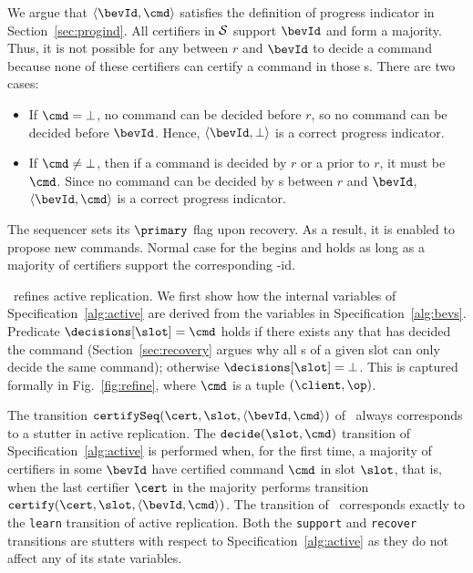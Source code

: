 We argue that $\langle \bevId, \cmd \rangle$ satisfies the definition
of progress indicator in Section~\ref{sec:progind}.  All certifiers
in $\cal S$ support $\bevId$ and form a majority.  Thus, it is not
possible for any {\round} between $r$ and $\bevId$ to decide a command
because none of these certifiers can certify a command in those
{\round}s.  There are two cases:

\begin{itemize}\item If $\cmd = \bot$, no command can be
decided before $r$, so no command can be decided before $\bevId$.
Hence, $\langle \bevId, \bot \rangle$ is a correct progress indicator.
\item If $\cmd \ne \bot$, then if a command is decided by
$r$ or a {\round} prior to $r$, it must be $\cmd$.
Since no command can be decided by {\round}s between $r$ and $\bevId$,
$\langle \bevId, \cmd \rangle$ is a correct progress indicator.
\end{itemize}



\noindent
The sequencer sets its $\primary$ flag upon recovery.  As a result, it
is enabled to propose new commands. Normal case for the {\round} begins
and holds as long as a majority of certifiers support the corresponding
{\round}-id.



\multiconsensus\ refines active replication.
We first show how the internal variables of Specification~\ref{alg:active} are
derived from the variables in Specification~\ref{alg:bevs}.
Predicate $\decisions[\slot] = \cmd$ holds if there exists any {\round} that has decided
the command (Section~\ref{sec:recovery} argues why all {\round}s of a given slot can only decide the same command); otherwise $\decisions[\slot] = \bot$.
This is captured formally in
Fig.~\ref{fig:refine}, where $\cmd$ is a tuple $(\client, \op)$.

The transition $\texttt{certifySeq}(\cert, \slot, \langle \bevId, \cmd \rangle)$
 of \multiconsensus\ always corresponds to a stutter in active replication.
The $\texttt{decide}(\slot, \cmd)$ transition
of Specification~\ref{alg:active} is performed
when, for the first time, a majority of certifiers in some
{\round} $\bevId$ have certified command $\cmd$
in slot $\slot$, that is, when
the last certifier $\cert$ in the majority performs transition
$\texttt{certify}(\cert, \slot, \langle \bevId, \cmd \rangle)$.
The \texttt{\observedecision} transition of \multiconsensus\ corresponds exactly
to the \texttt{learn} transition of active replication.  Both the \texttt{support{\Round}} and \texttt{recover} transitions are
stutters with respect to Specification~\ref{alg:active} as they
do not affect any of its state variables.


